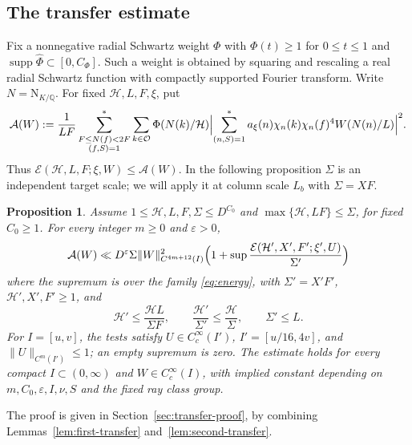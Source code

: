\documentclass[11pt,a4paper]{article}
\numberwithin{equation}{section}
\numberwithin{figure}{section}
\newtheorem{proposition}[theorem]{Proposition}
\theoremstyle{definition}
\theoremstyle{remark}
\newcommand{\Q}{\mathbb Q}
\newcommand{\NK}{\mathrm N_{K/\Q}}
\newcommand{\OO}{\mathcal O}
\newcommand{\E}{\mathcal E}
\begin{document}
\subsection{The transfer estimate}
Fix a nonnegative radial Schwartz weight $\Phi$ with
$\Phi(t)\ge1$ for $0\le t\le1$ and
$\operatorname{supp}\widehat\Phi\subset[0,C_\Phi]$.
Such a weight is obtained by squaring and rescaling a real radial
Schwartz function with compactly supported Fourier transform.
Write $N=\NK$. For fixed $\mathcal H,L,F,\xi$, put
\begin{equation}\label{eq:smoothed-energy}
 \mathcal A(W):=\frac1{LF}
 \sum_{\substack{F\le N(f)<2F\\(f,S)=1}}^*
 \sum_{k\in\OO}\Phi(N(k)/\mathcal H)
 \Bigl|\sum_{(n,S)=1}^*
 a_\xi(n)\chi_n(k)\chi_n(f)^4W(N(n)/L)\Bigr|^2.
\end{equation}
Thus $\E(\mathcal H,L,F;\xi,W)\le\mathcal A(W)$.
In the following proposition $\Sigma$ is an independent target scale;
we will apply it at column scale $L_b$ with $\Sigma=XF$.

\begin{proposition}\label{prop:transfer}
Assume $1\le\mathcal H,L,F,\Sigma\le D^{C_0}$ and
$\max\{\mathcal H,LF\}\le\Sigma$, for fixed $C_0\ge1$.
For every integer $m\ge0$ and $\varepsilon>0$,
\begin{equation}\label{eq:transfer-summary}
 \mathcal A(W)\ll D^\varepsilon\Sigma\|W\|_{C^{4m+12}(I)}^2
 \Bigl(1+\sup\frac{\E(\mathcal H',X',F';\xi',U)}{\Sigma'}\Bigr)
\end{equation}
where the supremum is over the family \eqref{eq:energy}, with
$\Sigma'=X'F'$, $\mathcal H',X',F'\ge1$, and
\begin{equation}\label{eq:transfer-scales}
 \mathcal H'\le\frac{\mathcal HL}{\Sigma F},\qquad
 \frac{\mathcal H'}{\Sigma'}\le
 \frac{\mathcal H}{\Sigma},\qquad
 \Sigma'\le L.
\end{equation}
For $I=[u,v]$, the tests satisfy
$U\in C_c^\infty(I')$, $I'=[u/16,4v]$, and
$\|U\|_{C^m(I')}\le1$; an empty supremum is zero.
The estimate holds for every compact $I\subset(0,\infty)$ and
$W\in C_c^\infty(I)$, with implied constant depending on
$m,C_0,\varepsilon,I,\nu,S$ and the fixed ray class group.
\end{proposition}

The proof is given in Section~\ref{sec:transfer-proof}, by combining
Lemmas~\ref{lem:first-transfer} and~\ref{lem:second-transfer}.
\end{document}
